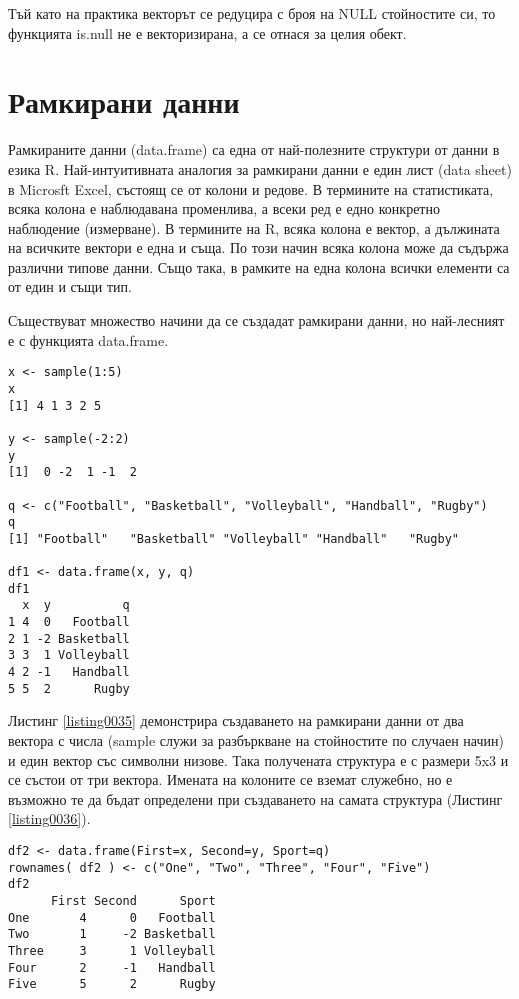 Тъй като на практика векторът се редуцира с броя на NULL стойностите си, то функцията is.null не е векторизирана, а се отнася за целия обект.

\section{Рамкирани данни}

Рамкираните данни (data.frame) са една от най-полезните структури от данни в езика R. Най-интуитивната аналогия за рамкирани данни е един лист (data sheet) в Microsft Excel, състоящ се от колони и редове. В термините на статистиката, всяка колона е наблюдавана променлива, а всеки ред е едно конкретно наблюдение (измерване). В термините на R, всяка колона е вектор, а дължината на всичките вектори е една и съща. По този начин всяка колона може да съдържа различни типове данни. Също така, в рамките на една колона всички елементи са от един и същи тип.

Съществуват множество начини да се създадат рамкирани данни, но най-лесният е с функцията data.frame.

\begin{lstlisting}[caption=Създаване на рамкирани данни, label=listing0035]
x <- sample(1:5)
x
[1] 4 1 3 2 5

y <- sample(-2:2)
y
[1]  0 -2  1 -1  2

q <- c("Football", "Basketball", "Volleyball", "Handball", "Rugby")
q
[1] "Football"   "Basketball" "Volleyball" "Handball"   "Rugby"

df1 <- data.frame(x, y, q)
df1
  x  y          q
1 4  0   Football
2 1 -2 Basketball
3 3  1 Volleyball
4 2 -1   Handball
5 5  2      Rugby
\end{lstlisting}

Листинг \ref{listing0035} демонстрира създаването на рамкирани данни от два вектора с числа (sample служи за разбъркване на стойностите по случаен начин) и един вектор със символни низове. Така получената структура е с размери 5x3 и се състои от три вектора. Имената на колоните се вземат служебно, но е възможно те да бъдат определени при създаването на самата структура (Листинг \ref{listing0036}).

\begin{lstlisting}[caption=Създаване на рамкирани данни с имена на колоните, label=listing0036]
df2 <- data.frame(First=x, Second=y, Sport=q)
rownames( df2 ) <- c("One", "Two", "Three", "Four", "Five")
df2
      First Second      Sport
One       4      0   Football
Two       1     -2 Basketball
Three     3      1 Volleyball
Four      2     -1   Handball
Five      5      2      Rugby
\end{lstlisting}

